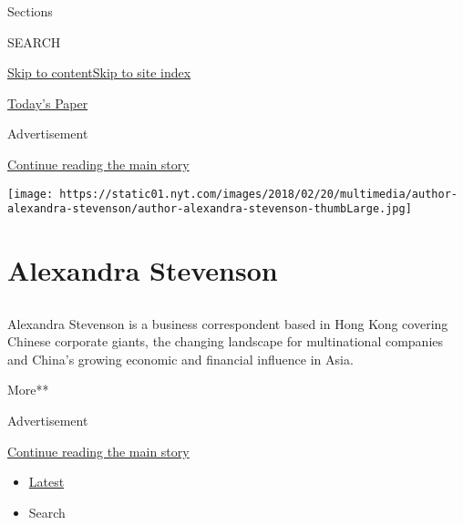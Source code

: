 Sections

SEARCH

\protect\hyperlink{site-content}{Skip to
content}\protect\hyperlink{site-index}{Skip to site index}

\href{https://myaccount.nytimes.com/auth/login?response_type=cookie\&client_id=vi}{}

\href{https://www.nytimes.com/section/todayspaper}{Today's Paper}

Advertisement

\protect\hyperlink{after-top}{Continue reading the main story}

\texttt{[image: https://static01.nyt.com/images/2018/02/20/multimedia/author-alexandra-stevenson/author-alexandra-stevenson-thumbLarge.jpg]}

\hypertarget{alexandra-stevenson}{%
\section{Alexandra Stevenson}\label{alexandra-stevenson}}

\subsection{}

Alexandra Stevenson is a business correspondent based in Hong Kong
covering Chinese corporate giants, the changing landscape for
multinational companies and China's growing economic and financial
influence in Asia.

More**

Advertisement

\protect\hyperlink{after-mid1}{Continue reading the main story}

\begin{itemize}
\tightlist
\item
  \protect\hyperlink{stream-panel}{Latest}
\item
  Search
\end{itemize}


